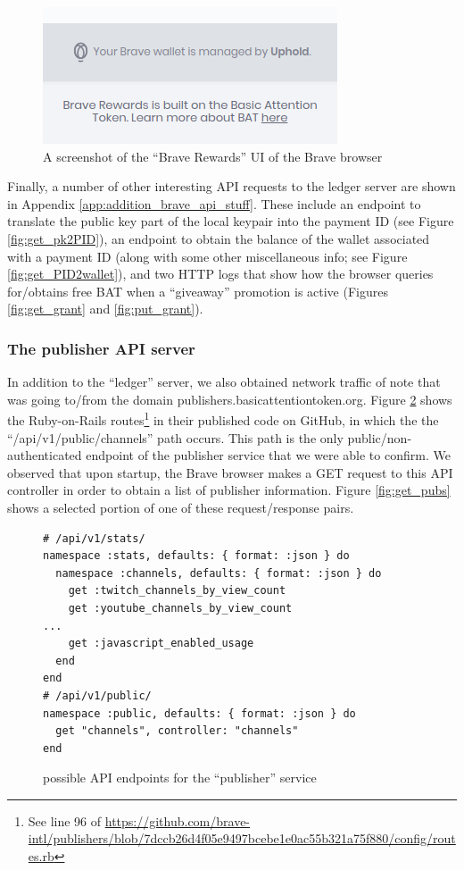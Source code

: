 \documentclass[sigconf]{acmart}
\begin{document}
\begin{figure}
\includegraphics[scale=0.5]{wallet-managed-by-uphold-screenshot.png}
\caption{A screenshot of the ``Brave Rewards'' UI of the Brave browser}
\label{fig:brave_uphold_wallet}
\end{figure}

Finally, a number of other interesting API requests to
the ledger server are shown in Appendix \ref{app:addition_brave_api_stuff}.
These include an endpoint to translate the public key part of
the local keypair into the payment ID (see Figure \ref{fig:get_pk2PID}),
an endpoint to obtain the balance of the wallet
associated with a payment ID (along with some other miscellaneous info; see Figure \ref{fig:get_PID2wallet}),
and two HTTP logs that show how the browser queries for/obtains
free BAT when a ``giveaway'' promotion is active
(Figures \ref{fig:get_grant} and \ref{fig:put_grant}).

\subsubsection{The publisher API server}
In addition to the ``ledger'' server,
we also obtained network traffic of note that was going to/from the 
domain publishers.basicattentiontoken.org.
Figure \ref{fig:pubs_routes} shows the Ruby-on-Rails routes\footnote{See line 96 of \url{https://github.com/brave-intl/publishers/blob/7dccb26d4f05e9497bcebe1e0ac55b321a75f880/config/routes.rb}}
in their published code 
on GitHub, in which the the ``/api/v1/public/channels'' path
occurs. This path is the only public/non-authenticated
endpoint of the publisher service
that we were able to confirm. We observed that upon
startup, the Brave browser makes a GET request to this
API controller in order to obtain a list of publisher information.
Figure \ref{fig:get_pubs} shows a selected portion
of one of these request/response pairs.

\begin{figure}
\begin{lstlisting}
# /api/v1/stats/
namespace :stats, defaults: { format: :json } do
  namespace :channels, defaults: { format: :json } do
    get :twitch_channels_by_view_count
    get :youtube_channels_by_view_count
...
    get :javascript_enabled_usage
  end
end
# /api/v1/public/
namespace :public, defaults: { format: :json } do
  get "channels", controller: "channels"
end
\end{lstlisting}
\caption{possible API endpoints for the ``publisher'' service}
\label{fig:pubs_routes}
\end{figure}
\end{document}
